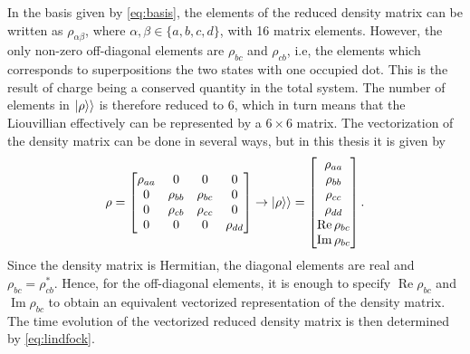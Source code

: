 \documentclass[../main.tex]{subfiles}
\begin{document}
In the basis given by \cref{eq:basis}, the elements of the reduced density matrix can be written as $\rho_{\alpha\beta}$, where $\alpha,\beta\in\{a,b,c,d\}$, with 16 matrix elements. However, the only non-zero off-diagonal elements are $\rho_{bc}$ and $\rho_{cb}$, i.e, the elements which corresponds to superpositions the two states with one occupied dot. This is the result of charge being a conserved quantity in the total system. The number of elements in $\ket{\rho}\rangle$ is therefore reduced to 6, which in turn means that the Liouvillian effectively can be represented by a $6\times6$ matrix. The vectorization of the density matrix can be done in several ways, but in this thesis it is given by
\begin{equation}\label{eq:order}
    \rho = \begin{bmatrix} \rho_{aa} & 0 & 0 & 0 \\
                    0 & \rho_{bb} & \rho_{bc} & 0 \\
                    0 & \rho_{cb} & \rho_{cc} & 0 \\
                    0 & 0 & 0 & \rho_{dd} \end{bmatrix} \rightarrow \ket{\rho}\rangle = \begin{bmatrix} \rho_{aa} \\ \rho_{bb} \\ \rho_{cc} \\ \rho_{dd} \\ \operatorname{Re}\rho_{bc} \\ \operatorname{Im}\rho_{bc}\end{bmatrix}.
\end{equation}
Since the density matrix is Hermitian, the diagonal elements are real and $\rho_{bc}=\rho_{cb}^*$. Hence, for the off-diagonal elements, it is enough to specify $\operatorname{Re}\rho_{bc}$ and $\operatorname{Im}\rho_{bc}$ to obtain an equivalent vectorized representation of the density matrix. The time evolution of the vectorized reduced density matrix is then determined by \cref{eq:lindfock}.


\end{document}
